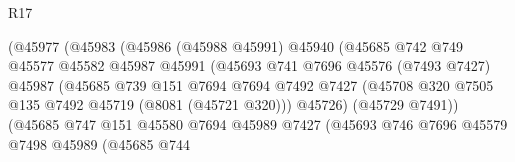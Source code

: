 \begin{lexlean}{R17}
\begin{coremodule}
                                    (@45977
                                      (@45983
                                        (@45986
                                          (@45988 @45991)
                                          @45940
                                          (@45685
                                            @742
                                            @749
                                            @45577
                                            @45582
                                            @45987
                                            @45991
                                            (@45693
                                              @741
                                              @7696
                                              @45576
                                              (@7493 @7427)
                                              @45987
                                              (@45685
                                                @739
                                                @151
                                                @7694
                                                @7694
                                                @7492
                                                @7427
                                                (@45708
                                                  @320
                                                  @7505
                                                  @135
                                                  @7492
                                                  @45719
                                                  (@8081 (@45721 @320)))
                                                @45726)
                                              (@45729 @7491))
                                            (@45685
                                              @747
                                              @151
                                              @45580
                                              @7694
                                              @45989
                                              @7427
                                              (@45693
                                                @746
                                                @7696
                                                @45579
                                                @7498
                                                @45989
                                                (@45685
                                                  @744

\end{coremodule}
\end{lexlean}
